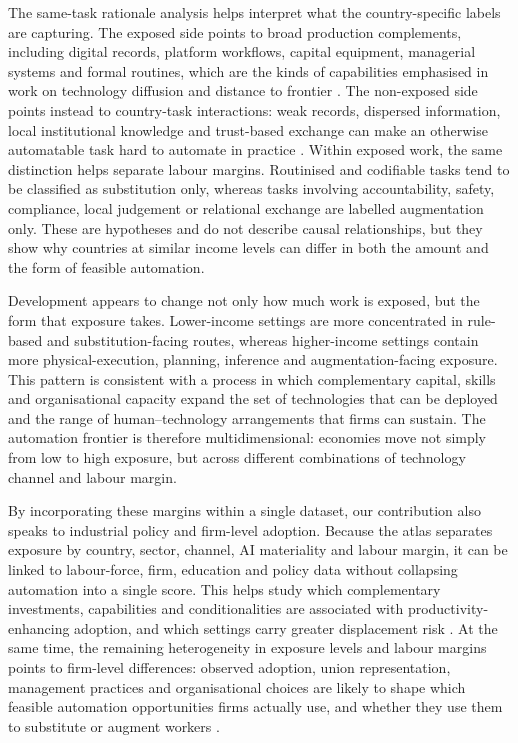 \documentclass[11pt]{article}
\begin{document}
The same-task rationale analysis helps interpret what the country-specific labels are capturing. The exposed side points to broad production complements, including digital records, platform workflows, capital equipment, managerial systems and formal routines, which are the kinds of capabilities emphasised in work on technology diffusion and distance to frontier \citep{CominHobijn2010,AcemogluAghionZilibotti2006DistanceToFrontier,CireraCominCruz2024}. The non-exposed side points instead to country-task interactions: weak records, dispersed information, local institutional knowledge and trust-based exchange can make an otherwise automatable task hard to automate in practice \citep{North1990Institutions,BakerGibbonsMurphy2002RelationalContracts}. Within exposed work, the same distinction helps separate labour margins. Routinised and codifiable tasks tend to be classified as substitution only, whereas tasks involving accountability, safety, compliance, local judgement or relational exchange are labelled augmentation only. These are hypotheses and do not describe causal relationships, but they show why countries at similar income levels can differ in both the amount and the form of feasible automation.

Development appears to change not only how much work is exposed, but the form that exposure takes. Lower-income settings are more concentrated in rule-based and substitution-facing routes, whereas higher-income settings contain more physical-execution, planning, inference and augmentation-facing exposure. This pattern is consistent with a process in which complementary capital, skills and organisational capacity expand the set of technologies that can be deployed and the range of human–technology arrangements that firms can sustain. The automation frontier is therefore multidimensional: economies move not simply from low to high exposure, but across different combinations of technology channel and labour margin.

By incorporating these margins within a single dataset, our contribution also speaks to industrial policy and firm-level adoption. Because the atlas separates exposure by country, sector, channel, AI materiality and labour margin, it can be linked to labour-force, firm, education and policy data without collapsing automation into a single score. This helps study which complementary investments, capabilities and conditionalities are associated with productivity-enhancing adoption, and which settings carry greater displacement risk \citep{cirera2022_innovationparadox,MazzucatoRodrik2026Conditionalities}. At the same time, the remaining heterogeneity in exposure levels and labour margins points to firm-level differences: observed adoption, union representation, management practices and organisational choices are likely to shape which feasible automation opportunities firms actually use, and whether they use them to substitute or augment workers \citep{Noble1984ForcesProduction,BresnahanBrynjolfssonHitt2002,BloomVanReenen2007,BloomSadunVanReenen2016,AgnolinAnelliColantoneStanig2025RobotsUnions,NoyZhang2023ProductivityEffectsGenAI}.
\end{document}

